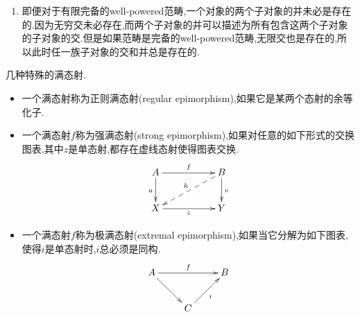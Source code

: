 \begin{enumerate}
\begin{proof}
		按照完备性,设这族态射构成的图表的极限为$\{p_i:L\to S_i\}$,它是锥说明要满足所有复合态射$s_i\circ p_i:L\to A$都要相同,记作$s$.我们断言$s$是单态射.设态射$x,y$使得$s\circ x=s\circ y$,那么有$s_i\circ p_i\circ x=s_i\circ p_i\circ y$.按照$s_i$是单态射得到$p_i\circ x=p_i\circ y$.按照极限的泛性质就有$x=y$.另外按照泛性质有它是这族子对象的下确界.
	\end{proof}
    \item 即便对于有限完备的well-powered范畴,一个对象的两个子对象的并未必是存在的.因为无穷交未必存在,而两个子对象的并可以描述为所有包含这两个子对象的子对象的交.但是如果范畴是完备的well-powered范畴,无限交也是存在的,所以此时任一族子对象的交和并总是存在的.
\end{enumerate}

几种特殊的满态射.
\begin{itemize}
	\item 一个满态射称为正则满态射(regular epimorphism),如果它是某两个态射的余等化子.
	\item 一个满态射$f$称为强满态射(strong epimorphism),如果对任意的如下形式的交换图表,其中$z$是单态射,都存在虚线态射使得图表交换.
	$$\xymatrix{A\ar[rr]^f\ar[d]_u&&B\ar[d]^v\ar@{-->}[dll]_h\\X\ar[rr]_z&&Y}$$
	\item 一个满态射$f$称为极满态射(extremal epimorphism),如果当它分解为如下图表,使得$i$是单态射时,$i$总必须是同构.
	$$\xymatrix{A\ar[rr]^f\ar[dr]&&B\\&C\ar[ur]_i&}$$
\end{itemize}
